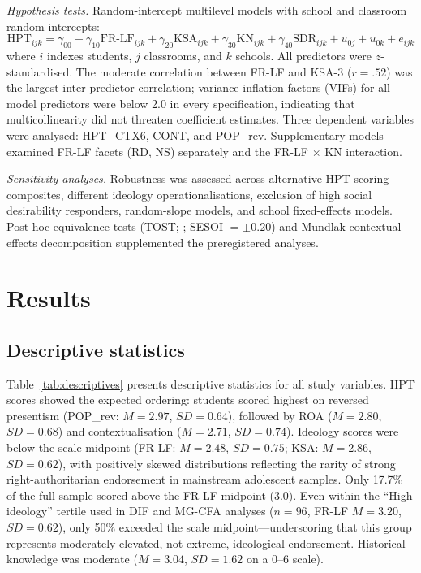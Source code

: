 \documentclass[pdflatex,sn-apa]{sn-jnl}%
\begin{document}
\emph{Hypothesis tests.} Random-intercept multilevel models with school and classroom random intercepts:
\begin{equation}\label{eq:model}
\text{HPT}_{ijk} = \gamma_{00} + \gamma_{10}\text{FR-LF}_{ijk} + \gamma_{20}\text{KSA}_{ijk} + \gamma_{30}\text{KN}_{ijk} + \gamma_{40}\text{SDR}_{ijk} + u_{0j} + u_{0k} + e_{ijk}
\end{equation}
where $i$ indexes students, $j$ classrooms, and $k$ schools. All predictors were $z$-standardised. The moderate correlation between FR-LF and KSA-3 ($r = .52$) was the largest inter-predictor correlation; variance inflation factors (VIFs) for all model predictors were below 2.0 in every specification, indicating that multicollinearity did not threaten coefficient estimates. Three dependent variables were analysed: HPT\_CTX6, CONT, and POP\_rev. Supplementary models examined FR-LF facets (RD, NS) separately and the FR-LF $\times$ KN interaction.

\emph{Sensitivity analyses.} Robustness was assessed across alternative HPT scoring composites, different ideology operationalisations, exclusion of high social desirability responders, random-slope models, and school fixed-effects models. Post hoc equivalence tests (TOST; \citealp{Lakens2017}; SESOI $= \pm 0.20$) and Mundlak contextual effects decomposition \citep{Mundlak1978} supplemented the preregistered analyses.


\section{Results}\label{sec:results}

\subsection{Descriptive statistics}\label{subsec:descriptives}

Table~\ref{tab:descriptives} presents descriptive statistics for all study variables. HPT scores showed the expected ordering: students scored highest on reversed presentism (POP\_rev: $M = 2.97$, $SD = 0.64$), followed by ROA ($M = 2.80$, $SD = 0.68$) and contextualisation ($M = 2.71$, $SD = 0.74$). Ideology scores were below the scale midpoint (FR-LF: $M = 2.48$, $SD = 0.75$; KSA: $M = 2.86$, $SD = 0.62$), with positively skewed distributions reflecting the rarity of strong right-authoritarian endorsement in mainstream adolescent samples. Only 17.7\% of the full sample scored above the FR-LF midpoint (3.0). Even within the ``High ideology'' tertile used in DIF and MG-CFA analyses ($n = 96$, FR-LF $M = 3.20$, $SD = 0.62$), only 50\% exceeded the scale midpoint---underscoring that this group represents moderately elevated, not extreme, ideological endorsement. Historical knowledge was moderate ($M = 3.04$, $SD = 1.62$ on a 0--6 scale).
\end{document}

